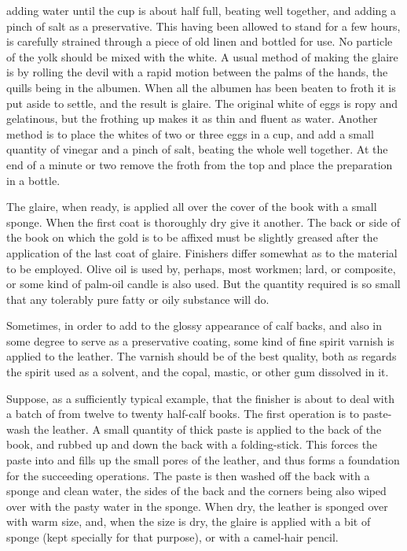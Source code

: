 \documentclass[twoside]{book}
\begin{document}
adding water until the cup is about half full, beating
well together, and adding a pinch of salt as a
preservative. This having been allowed to stand for a
\pagebreak
few hours, is carefully strained through a piece of
old linen and bottled for use. No particle of the
yolk should be mixed with the white. A usual
method of making the glaire is by rolling the devil
with a rapid motion between the palms of the hands,
the quills being in the albumen. When all the
albumen has been beaten to froth it is put aside to
settle, and the result is glaire. The original white
of eggs is ropy and gelatinous, but the frothing up
makes it as thin and fluent as water. Another
method is to place the whites of two or three eggs
in a cup, and add a small quantity of vinegar and a
pinch of salt, beating the whole well together. At
the end of a minute or two remove the froth from
the top and place the preparation in a bottle.

The glaire, when ready, is applied all over the
cover of the book with a small sponge. When the
first coat is thoroughly dry give it another.
The back or side of the book on which the gold
is to be affixed must be slightly greased after the
application of the last coat of glaire. Finishers
differ somewhat as to the material to be employed.
Olive oil is used by, perhaps, most workmen; lard,
or composite, or some kind of palm-oil candle is also
used. But the quantity required is so small that
any tolerably pure fatty or oily substance will do.

Sometimes, in order to add to the glossy appearance
of calf backs, and also in some degree to serve
as a preservative coating, some kind of fine spirit
varnish is applied to the leather. The varnish
should be of the best quality, both as regards the
spirit used as a solvent, and the copal, mastic, or
other gum dissolved in it.

Suppose, as a sufficiently typical example, that
the finisher is about to deal with a batch of from
twelve to twenty half-calf books. The first operation
is to paste-wash the leather. A small quantity
of thick paste is applied to the back of the book, and
rubbed up and down the back with a folding-stick.
\pagebreak
This forces the paste into and fills up the small
pores of the leather, and thus forms a foundation for
the succeeding operations. The paste is then
washed off the back with a sponge and clean water,
the sides of the back and the corners being also
wiped over with the pasty water in the sponge.
When dry, the leather is sponged over with warm
size, and, when the size is dry, the glaire is applied
with a bit of sponge (kept specially for that purpose),
or with a camel-hair pencil.
\end{document}
